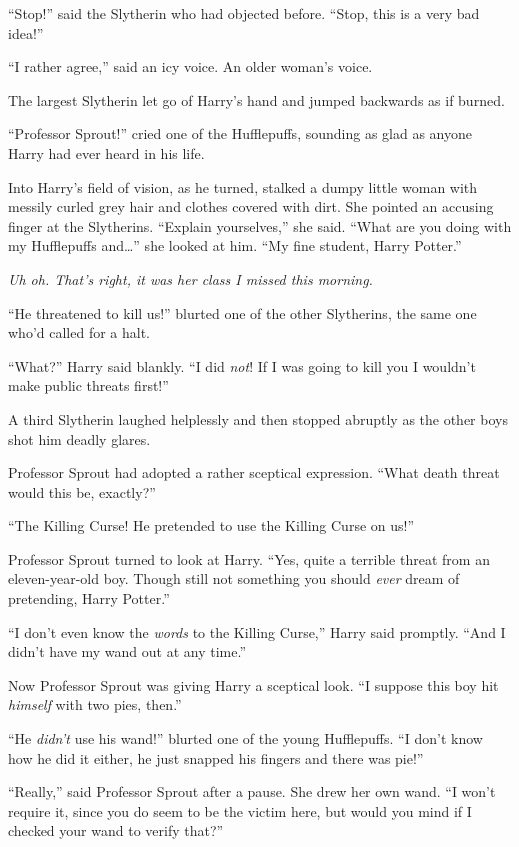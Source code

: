 “Stop!” said the Slytherin who had objected before. “Stop, this is a very bad idea!”

“I rather agree,” said an icy voice. An older woman’s voice.

The largest Slytherin let go of Harry’s hand and jumped backwards as if burned.

“Professor Sprout!” cried one of the Hufflepuffs, sounding as glad as anyone Harry had ever heard in his life.

Into Harry’s field of vision, as he turned, stalked a dumpy little woman with messily curled grey hair and clothes covered with dirt. She pointed an accusing finger at the Slytherins. “Explain yourselves,” she said. “What are you doing with my Hufflepuffs and…” she looked at him. “My fine student, Harry Potter.”

\emph{Uh oh. That’s right, it was \emph{her} class I missed this morning.}

“He threatened to kill us!” blurted one of the other Slytherins, the same one who’d called for a halt.

“What?” Harry said blankly. “I did \emph{not}! If I was going to kill you I wouldn’t make public threats first!”

A third Slytherin laughed helplessly and then stopped abruptly as the other boys shot him deadly glares.

Professor Sprout had adopted a rather sceptical expression. “What death threat would this be, exactly?”

“The Killing Curse! He pretended to use the Killing Curse on us!”

Professor Sprout turned to look at Harry. “Yes, quite a terrible threat from an eleven-year-old boy. Though still not something you should \emph{ever} dream of pretending, Harry Potter.”

“I don’t even know the \emph{words} to the Killing Curse,” Harry said promptly. “And I didn’t have my wand out at any time.”

Now Professor Sprout was giving Harry a sceptical look. “I suppose this boy hit \emph{himself} with two pies, then.”

“He \emph{didn’t} use his wand!” blurted one of the young Hufflepuffs. “I don’t know how he did it either, he just snapped his fingers and there was pie!”

“Really,” said Professor Sprout after a pause. She drew her own wand. “I won’t require it, since you do seem to be the victim here, but would you mind if I checked your wand to verify that?”

